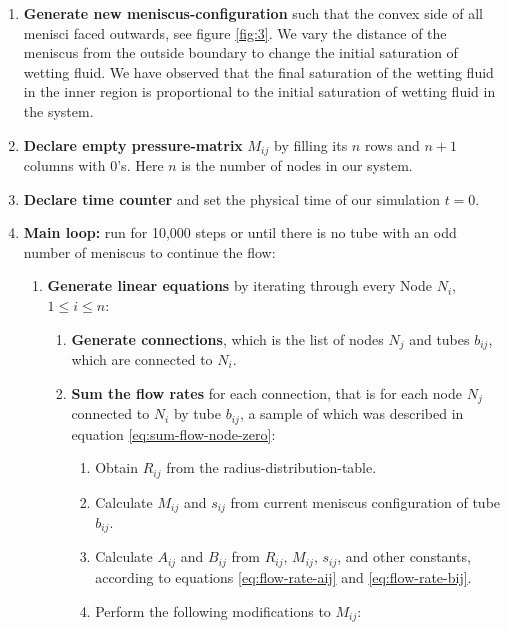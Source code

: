 \documentclass[
	12pt
] {article}
\begin{document}
\begin{enumerate}
	\item \textbf{Generate new meniscus-configuration} such that the convex side of all menisci faced outwards, see figure \ref{fig:3}. We vary the distance of the meniscus from the outside boundary to change the initial saturation of wetting fluid. We have observed that the final saturation of the wetting fluid in the inner region is proportional to the initial saturation of wetting fluid in the system.
	
	\item \textbf{Declare empty pressure-matrix} $M_{ij}$ by filling its $n$ rows and $n + 1$ columns with $0$'s. Here $n$ is the number of nodes in our system.
	
	\item \textbf{Declare time counter} and set the physical time of our simulation $t = 0$.
	
	\item \textbf{Main loop:} run for 10,000 steps or until there is no tube with an odd number of meniscus to continue the flow:
	\begin{enumerate}
		\item \textbf{Generate linear equations} by iterating through every Node $N_i$, $1 \le i \le n$:
		
		\begin{enumerate}
			\item \textbf{Generate connections}, which is the list of nodes $N_j$ and tubes $b_{ij}$, which are connected to $N_i$.
			
			\item \textbf{Sum the flow rates} for each connection, that is for each node $N_j$ connected to $N_i$ by tube $b_{ij}$, a sample of which was described in equation \ref{eq:sum-flow-node-zero}:
			
			\begin{enumerate}
				\item Obtain $R_{ij}$ from the radius-distribution-table.
				
				\item Calculate $M_{ij}$ and $s_{ij}$ from current meniscus configuration of tube $b_{ij}$.
				
				\item Calculate $A_{ij}$ and $B_{ij}$ from $R_{ij}$, $M_{ij}$, $s_{ij}$, and other constants, according to equations \ref{eq:flow-rate-aij} and \ref{eq:flow-rate-bij}.
				
				\item Perform the following modifications to $M_{ij}$:
				

\end{enumerate}
\end{enumerate}
\end{enumerate}
\end{enumerate}
\end{document}
